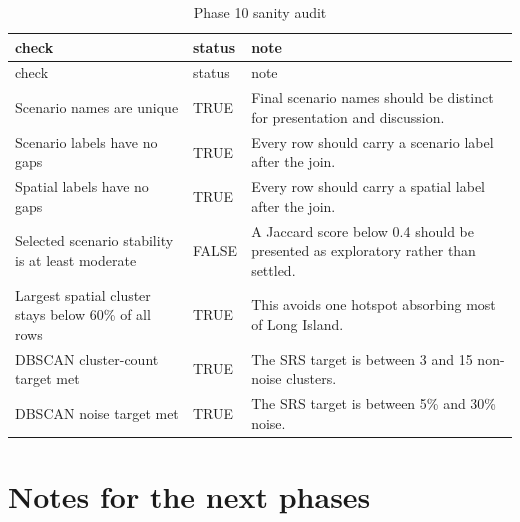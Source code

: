 \documentclass[
]{article}
\begin{document}
\begin{longtable}[]{@{}
  >{\raggedright\arraybackslash}p{}
  >{\raggedright\arraybackslash}p{}
  >{\raggedright\arraybackslash}p{}@{}}
\caption{Phase 10 sanity audit}\tabularnewline
\toprule\noalign{}
\begin{minipage}[b]{\linewidth}\raggedright
check
\end{minipage} & \begin{minipage}[b]{\linewidth}\raggedright
status
\end{minipage} & \begin{minipage}[b]{\linewidth}\raggedright
note
\end{minipage} \\
\midrule\noalign{}
\endfirsthead
\toprule\noalign{}
\begin{minipage}[b]{\linewidth}\raggedright
check
\end{minipage} & \begin{minipage}[b]{\linewidth}\raggedright
status
\end{minipage} & \begin{minipage}[b]{\linewidth}\raggedright
note
\end{minipage} \\
\midrule\noalign{}
\endhead
\bottomrule\noalign{}
\endlastfoot
Scenario names are unique & TRUE & Final scenario names should be
distinct for presentation and discussion. \\
Scenario labels have no gaps & TRUE & Every row should carry a scenario
label after the join. \\
Spatial labels have no gaps & TRUE & Every row should carry a spatial
label after the join. \\
Selected scenario stability is at least moderate & FALSE & A Jaccard
score below 0.4 should be presented as exploratory rather than
settled. \\
Largest spatial cluster stays below 60\% of all rows & TRUE & This
avoids one hotspot absorbing most of Long Island. \\
DBSCAN cluster-count target met & TRUE & The SRS target is between 3 and
15 non-noise clusters. \\
DBSCAN noise target met & TRUE & The SRS target is between 5\% and 30\%
noise. \\
\end{longtable}

\section{Notes for the next phases}\label{notes-for-the-next-phases}
\end{document}
